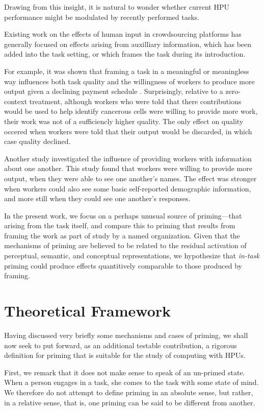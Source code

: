 \documentclass[letterpaper, 11pt, twocolumn]{article}
\begin{document}
Drawing from this insight, it is natural to wonder whether current HPU 
performance might be modulated by recently performed tasks.

Existing work on the effects of human input in crowdsourcing platforms has
generally focused on effects arising from auxilliary information, which has
been added into the task setting, or which frames the task during its 
introduction.  

For example, it was shown that framing a task in a meaningful or meaningless
way influences both task quality and the willingness of workers to produce
more output given a declining payment schedule \cite{chandler2013breaking}.
Surprisingly, relative to a zero-context treatment, although workers who were
told that there contributions would be used to help identify cancerous cells
were willing to provide more work, their work was not of a sufficiencly higher
quality.  The only effect on quality occered when workers were told that their
output would be discarded, in which case quality declined.

Another study investigated the influence of providing workers with information
about one another.  This study found that workers were willing to provide
more output, when they were able to see one another's names.  The effect was 
stronger when workers could also see some basic self-reported demographic 
information, and more still when they could see one another's responses.

In the present work, we focus on a perhaps unusual source of priming---that 
arising from the task itself, and compare this to priming that results from 
framing the work as part of study by a named organization.  Given that the 
mechanisms of priming are believed to be related to the residual activation of
perceptual, semantic, and conceptual representations, we hypothesize that 
\textit{in-task} priming could produce effects quantitively comparable to those
produced by framing.

\section*{Theoretical Framework}
Having discussed very briefly some mechanisms and cases of priming, we shall 
now seek to put forward, as an additional testable contribution, a rigorous
definition for priming that is suitable for the study of computing with HPUs.

First, we remark that it does not make sense to speak of an un-primed 
state.  When a person engages in a task, she comes to the task with some 
state of mind.  We therefore do not attempt to define priming in an absolute
sense, but rather, in a relative sense, that is, one priming can be said to 
be different from another.
\end{document}
